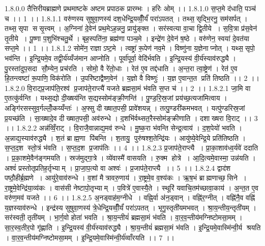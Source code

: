 1.8.0.0
तैत्तिरीयब्राह्मणे प्रथमाष्टके अष्टम प्रपाठक प्रारम्भः । हरिः ओम् ।।
1.8.1.0
स॒प्त॒मे द॑धाति॒ पञ्च॑ च ।। 1 ।।
1.8.1.1
वरु॑णस्य सुषुवा॒णस्य॑ दश॒धेन्द्रि॒यव्वीँ॒र्यं॑ परा॑ऽपतत् । तथ्स॒॒सृद्भि॒रनु॒ सम॑सर्पत् । तथ्स॒॒सृपा॑ ससृ॒त्त्वम् । अ॒ग्निना॑ दे॒वेन॑ प्रथ॒मेऽह॒न्ननु॒ प्रायु॑ङ्क्त । सर॑स्वत्या वा॒चा द्वि॒तीये । स॒वि॒त्रा प्र॑स॒वेन॑ तृ॒तीये । पू॒ष्णा प॒शुभि॑श्चतु॒र्थे । बृह॒स्पति॑ना॒ ब्रह्म॑णा पञ्च॒मे । इन्द्रे॑ण दे॒वेन॑ ष॒ष्ठे । वरु॑णेन॒ स्वया॑ दे॒वत॑या सप्त॒मे ।। 1 ।।
1.8.1.2
सोमे॑न॒ राज्ञाऽष्ट॒मे । त्वष्ट्रा॑ रू॒पेण॑ नव॒मे । विष्णु॑ना य॒ज्ञेनाप्नोत् । यथ्स॒॒सृपो॒ भव॑न्ति । इ॒न्द्रि॒यमे॒व तद्वी॒र्य॑य्यँज॑मान आप्नोति । पूर्वा॑पूर्वा॒ वेदि॑र्भवति । इ॒न्द्रि॒यस्य॑ वी॒र्य॑स्याव॑रुद्ध्यै । पु॒रस्ता॑दुप॒सदा॑ सौ॒म्येन॒ प्रच॑रति । सोमो॒ वै रे॑तो॒धाः । रेत॑ ए॒व तद्द॑धाति । अ॒न्त॒रा त्वा॒ष्ट्रेण॑ । रेत॑ ए॒व हि॒तन्त्वष्टा॑ रू॒पाणि॒ विक॑रोति । उ॒परि॑ष्टाद्वैष्ण॒वेन॑ । य॒ज्ञो वै विष्णुः॑ । य॒ज्ञ ए॒वान्त॒त प्रति॑ तिष्ठति ।। 2 ।।
1.8.2.0
वि॒राट्प्र॒जाप॑ति॒रश्व॑ प्र॒जाप॑ते॒राप्त्यै॑ यजते ब्रह्मसा॒मं भ॑वति स॒प्त च॑ ।। 2 ।।
1.8.2.1
जा॒मि वा ए॒तत्कु॑र्वन्ति । यथ्स॒द्यो दी॒ख्षय॑न्ति स॒द्यस्सोम॑ङ्क्री॒णन्ति॑ । पु॒ण्ड॒रि॒स्र॒जां प्रय॑च्छ॒त्यजा॑मित्वाय । अङ्गि॑रसस्सुव॒र्गल्लोँ॒कय्यँन्तः॑ । अ॒फ्सु दीख्षात॒पसी॒ प्रावे॑शयन्न् । तत्पु॒ण्डरी॑कमभवत् । यत्पु॑ण्डरिस्र॒जां प्र॒यच्छ॑ति । सा॒ख्षादे॒व दीख्षात॒पसी॒ अव॑रुन्धे । द॒शभि॑र्वथ्सत॒रैस्सोम॑ङ्क्रीणाति । दशाख्षरा वि॒राट् ।। 3 ।।
1.8.2.2
अन्न॑व्विँ॒राट् । वि॒राजै॒वान्नाद्य॒मव॑ रुन्धे । मु॒ष्क॒रा भ॑वन्ति सेन्द्र॒त्वाय॑ । द॒श॒पेयो॑ भवति । अ॒न्नाद्य॒स्याव॑रुद्ध्यै । श॒तं ब्राह्म॒णा पि॑बन्ति । श॒तायु॒ पुरु॑षश्श॒तेन्द्रि॑यः । आयु॑ष्ये॒वेन्द्रि॒ये प्रति॑तिष्ठति । स॒प्त॒द॒श स्तो॒त्रं भ॑वति । स॒प्त॒द॒श प्र॒जाप॑तिः ।। 4 ।।
1.8.2.3
प्र॒जाप॑ते॒राप्त्यै । प्रा॒का॒शाव॑ध्व॒र्यवे॑ ददाति । प्र॒का॒शमे॒वैन॑ङ्गमयति । स्रज॑मुद्गा॒त्रे । व्ये॑वास्मै॑ वासयति । रु॒क्म होत्रे । आ॒दि॒त्यमे॒वास्मा॒ उन्न॑यति । अश्वं॑ प्रस्तोतृप्रतिह॒र्तृभ्याम् । प्रा॒जा॒प॒त्यो वा अश्वः॑ । प्र॒जाप॑ते॒राप्त्यै ।। 5 ।।
1.8.2.4
द्वाद॑श पष्ठौ॒हीर्ब्र॒ह्मणे । आयु॑रे॒वाव॑रुन्धे । व॒शां मैत्रावरु॒णाय॑ । रा॒ष्ट्रमे॒व व॒श्य॑कः । ऋ॒ष॒भं ब्राह्मणाच्छ॒॒सिने । रा॒ष्ट्रमे॒वेन्द्रि॑या॒व्य॑कः । वास॑सी नेष्टापो॒तृभ्याम् । प॒वित्रे॑ ए॒वास्यै॒ते । स्थूरि॑ यवाचि॒तम॑च्छावा॒काय॑ । अ॒न्त॒त ए॒व वरु॑ण॒मव॑ यजते ।। 6 ।।
1.8.2.5
अ॒नड्वाह॑म॒ग्नीधे । वह्नि॒र्वा अ॑न॒ड्वान् । वह्नि॑र॒ग्नीत् । वह्नि॑नै॒व वह्नि॑ य॒ज्ञस्याव॑रुन्धे । इन्द्र॑स्य सुषुवा॒णस्य॑ त्रे॒धेन्द्रि॒यव्वीँ॒र्यं॑ परा॑ऽपतत् । भृगु॒स्तृती॑यमभवत् । श्रा॒य॒न्तीय॒न्तृती॑यम् । सर॑स्वती॒ तृती॑यम् । भा॒र्ग॒वो होता॑ भवति । श्रा॒य॒न्तीयं॑ ब्रह्मसा॒मं भ॑वति । वा॒र॒व॒न्तीय॑मग्निष्टोमसा॒मम् । सा॒र॒स्व॒तीर॒पो गृ॑ह्णाति । इ॒न्द्रि॒यस्य॑ वी॒र्य॑स्याव॑रुद्ध्यै । श्रा॒य॒न्तीयं॑ ब्रह्मसा॒मं भ॑वति । इ॒न्द्रि॒यमे॒वास्मि॑न्वी॒र्य॑ श्रयति । वा॒र॒व॒न्तीय॑मग्निष्टोमसा॒मम् । इ॒न्द्रि॒यमे॒वास्मि॑न्वी॒र्य॑व्वाँरयति ।। 7 ।।
